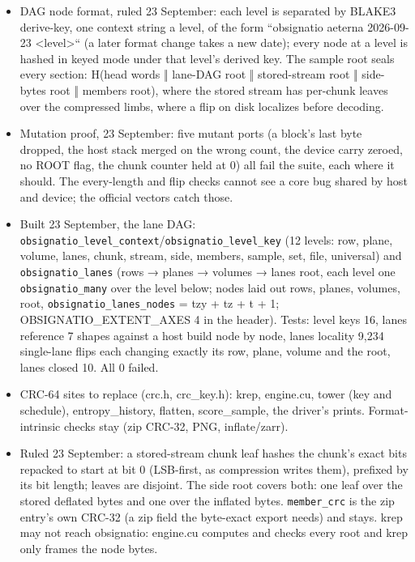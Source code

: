 \begin{itemize}
\item DAG node format, ruled 23 September: each level is separated by BLAKE3 derive-key, one context string a level, of the form “obsignatio aeterna 2026-09-23 <level>“ (a later format change takes a new date); every node at a level is hashed in keyed mode under that level's derived key. The sample root seals every section: H(head words ‖ lane-DAG root ‖ stored-stream root ‖ side-bytes root ‖ members root), where the stored stream has per-chunk leaves over the compressed limbs, where a flip on disk localizes before decoding.
\item Mutation proof, 23 September: five mutant ports (a block's last byte dropped, the host stack merged on the wrong count, the device carry zeroed, no ROOT flag, the chunk counter held at 0) all fail the suite, each where it should. The every-length and flip checks cannot see a core bug shared by host and device; the official vectors catch those.
\item Built 23 September, the lane DAG: \texttt{obsignatio\_\allowbreak{}level\_\allowbreak{}context}/\texttt{obsignatio\_\allowbreak{}level\_\allowbreak{}key} (12 levels: row, plane, volume, lanes, chunk, stream, side, members, sample, set, file, universal) and \texttt{obsignatio\_\allowbreak{}lanes} (rows → planes → volumes → lanes root, each level one \texttt{obsignatio\_\allowbreak{}many} over the level below; nodes laid out rows, planes, volumes, root, \texttt{obsignatio\_\allowbreak{}lanes\_\allowbreak{}nodes} = tzy + tz + t + 1; OBSIGNATIO\_\allowbreak{}EXTENT\_\allowbreak{}AXES 4 in the header). Tests: level keys 16, lanes reference 7 shapes against a host build node by node, lanes locality 9,234 single-lane flips each changing exactly its row, plane, volume and the root, lanes closed 10. All 0 failed.
\item CRC-64 sites to replace (crc.h, crc\_\allowbreak{}key.h): krep, engine.cu, tower (key and schedule), entropy\_\allowbreak{}history, flatten, score\_\allowbreak{}sample, the driver's prints. Format-intrinsic checks stay (zip CRC-32, PNG, inflate/zarr).
\item Ruled 23 September: a stored-stream chunk leaf hashes the chunk's exact bits repacked to start at bit 0 (LSB-first, as compression writes them), prefixed by its bit length; leaves are disjoint. The side root covers both: one leaf over the stored deflated bytes and one over the inflated bytes. \texttt{member\_\allowbreak{}crc} is the zip entry's own CRC-32 (a zip field the byte-exact export needs) and stays. krep may not reach obsignatio: engine.cu computes and checks every root and krep only frames the node bytes.

\end{itemize}
